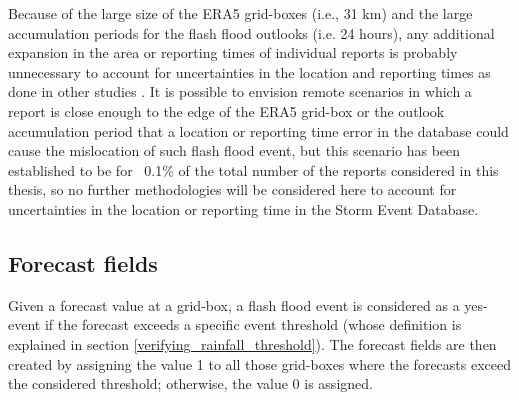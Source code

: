 Because of the large size of the ERA5 grid-boxes (i.e., 31 km) and the large accumulation periods for the flash flood outlooks (i.e. 24 hours), any additional expansion in the area or reporting times of individual reports is probably unnecessary to account for uncertainties in the location and reporting times as done in other studies \citep{Cavaiola_2024}. It is possible to envision remote scenarios in which a report is close enough to the edge of the ERA5 grid-box or the outlook accumulation period that a location or reporting time error in the database could cause the mislocation of such flash flood event, but this scenario has been established to be for ~0.1\% of the total number of the reports considered in this thesis, so no further methodologies will be considered here to account for uncertainties in the location or reporting time in the Storm Event Database. 

\subsection{Forecast fields}

Given a forecast value at a grid-box, a flash flood event is considered as a yes-event if the forecast exceeds a specific event threshold (whose definition is explained in section \ref{verifying_rainfall_threshold}). The forecast fields are then created by assigning the value 1 to all those grid-boxes where the forecasts exceed the considered threshold; otherwise, the value 0 is assigned. 

